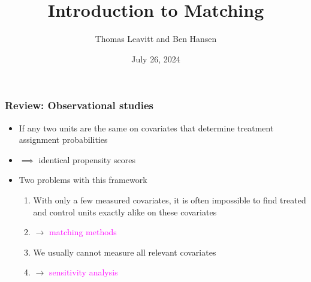 \documentclass[table, xcolor = {dvipsnames}, 9pt]{beamer}
\title[]{Introduction to Matching} %
\author{Thomas Leavitt and Ben Hansen}
\institute[]
{

}
\date{July 26, 2024}
\theoremstyle{plain}
\begin{document}
\begin{frame}
\titlepage %
\end{frame}


\begin{frame}[t]
\frametitle{Review: Observational studies}
\vfill
\begin{itemize} \vfill
\item If any two units are the same on covariates that determine treatment assignment probabilities \vfill
\item[] $\implies$ identical propensity scores \vfill
\item Two problems with this framework \vfill
\begin{enumerate} \vfill
\item With only a few measured covariates, it is often impossible to find treated and control units exactly alike on these covariates \vfill
\item[] $\rightarrow$ \textcolor{magenta}{matching methods} \vfill
\item We usually cannot measure all relevant covariates \vfill
\item[] $\rightarrow$ \textcolor{magenta}{sensitivity analysis} \vfill
\end{enumerate}  
\end{itemize}
\vfill
\end{frame}
\end{document}
